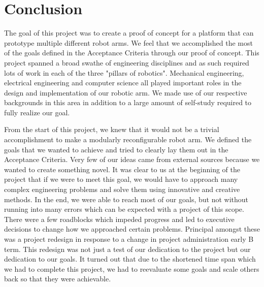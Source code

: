 \section{Conclusion}

The goal of this project was to create a proof of concept for a platform that can prototype multiple different robot arms. We feel that we accomplished the most of the goals defined in the Acceptance Criteria through our proof of concept. This project spanned a broad swathe of engineering disciplines and as such required lots of work in each of the three "pillars of robotics". Mechanical engineering, electrical engineering and computer science all played important roles in the design and implementation of our robotic arm. We made use of our respective backgrounds in this area in addition to a large amount of self-study required to fully realize our goal. 

\noindent From the start of this project, we knew that it would not be a trivial accomplishment to make a modularly reconfigurable robot arm. We defined the goals that we wanted to achieve and tried to clearly lay them out in the Acceptance Criteria. Very few of our ideas came from external sources because we wanted to create something novel. It was clear to us at the beginning of the project that if we were to meet this goal, we would have to approach many complex engineering problems and solve them using innovative and creative methods. In the end, we were able to reach most of our goals, but not without running into many errors which can be expected with a project of this scope. There were a few roadblocks which impeded progress and led to executive decisions to change how we approached certain problems. Principal amongst these was a project redesign in response to a change in project administration early B term. This redesign was not just a test of our dedication to the project but our dedication to our goals. It turned out that due to the shortened time span which we had to complete this project, we had to reevaluate some goals and scale others back so that they were achievable. 

